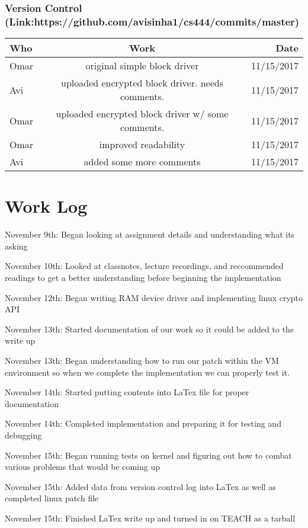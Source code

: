 \documentclass[onecolumn, draftclsnofoot,10pt, compsoc]{IEEEtran}
\begin{document}
\subsubsection{Version Control (Link:https://github.com/avisinha1/cs444/commits/master)}
\begin{center}
	\begin{tabular}{ | l | c | r|}
		\hline
		Who & Work & Date \\
		\hline
		Omar & original simple block driver & 11/15/2017\\
		\hline
		Avi & uploaded encrypted block driver. needs comments. & 11/15/2017\\
		\hline
		Omar & uploaded encrypted block driver w/ some comments. & 11/15/2017 \\
		\hline
		Omar & improved readability & 11/15/2017 \\
		\hline
		Avi & added some more comments & 11/15/2017 \\
		\hline
	\end{tabular}
\end{center}	

\section{Work Log}

	November 9th: Began looking at assignment details and understanding what its asking 
	
	November 10th: Looked at classnotes, lecture recordings, and reccommended readings to get a better understanding before beginning the implementation
	
	November 12th: Began writing RAM device driver and implementing linux crypto API
	
	November 13th: Started documentation of our work so it could be added to the write up
	
	November 13th: Began understanding how to run our patch within the VM environment so when we complete the implementation we can properly test it. 
	
	November 14th: Started putting contents into LaTex file for proper documentation
	
	November 14th: Completed implementation and preparing it for testing and debugging
	
	November 15th: Began running tests on kernel and figuring out how to combat various problems that would be coming up
	
	November 15th: Added data from version control log into LaTex as well as completed linux patch file
	
	November 15th: Finished LaTex write up and turned in on TEACH as a tarball
	
\end{document}
